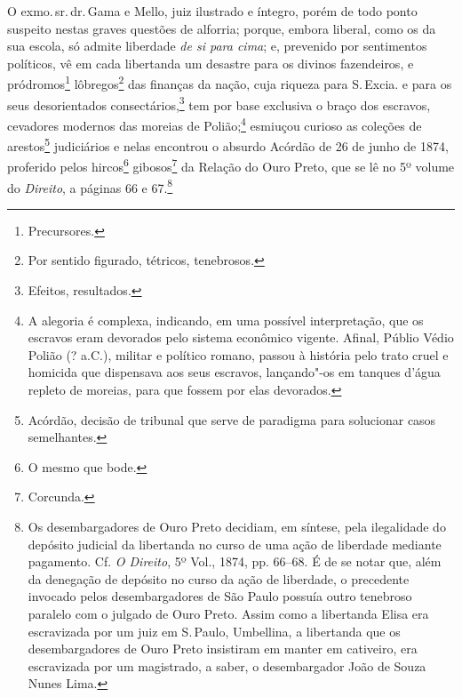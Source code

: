 O exmo.\,sr.\,dr.\,Gama e Mello, juiz ilustrado e íntegro, porém de todo
ponto suspeito nestas graves questões de alforria; porque, embora
liberal, como os da sua escola, só admite liberdade \emph{de si para
cima}; e, prevenido por sentimentos políticos, vê em cada libertanda um
desastre para os divinos fazendeiros, e pródromos\footnote{
  Precursores.} lôbregos\footnote{Por sentido figurado, tétricos,
  tenebrosos.} das finanças da nação, cuja riqueza para S.\,Excia. e para
os seus desorientados consectários,\footnote{Efeitos, resultados.} tem
por base exclusiva o braço dos escravos, cevadores modernos das moreias
de Polião;\footnote{A alegoria é complexa, indicando, em uma possível
  interpretação, que os escravos eram devorados pelo sistema econômico vigente.
  Afinal, Públio Védio Polião (? a.C.), militar e político romano,
  passou à história pelo trato cruel e homicida que dispensava aos seus
  escravos, lançando"-os em tanques d'água repleto de moreias, para que
  fossem por elas devorados.} esmiuçou curioso as coleções de
arestos\footnote{Acórdão, decisão de tribunal que serve de paradigma
  para solucionar casos semelhantes.} judiciários e nelas encontrou o
absurdo Acórdão de 26 de junho de 1874, proferido pelos hircos\footnote{
  O mesmo que bode.} gibosos\footnote{Corcunda.} da Relação do Ouro
Preto, que se lê no 5º volume do \emph{Direito}, a páginas 66 e
67.\footnote{Os desembargadores de Ouro Preto decidiam, em síntese,
  pela ilegalidade do depósito judicial da libertanda no curso de uma
  ação de liberdade mediante pagamento. Cf. \emph{O Direito}, 5º Vol.,
  1874, pp. 66--68. É de se notar que, além da denegação de depósito no
  curso da ação de liberdade, o precedente invocado pelos
  desembargadores de São Paulo possuía outro tenebroso paralelo com o
  julgado de Ouro Preto. Assim como a libertanda Elisa era escravizada
  por um juiz em S.\,Paulo, Umbellina, a libertanda que os
  desembargadores de Ouro Preto insistiram em manter em cativeiro, era
  escravizada por um magistrado, a saber, o desembargador João de Souza
  Nunes Lima.}


